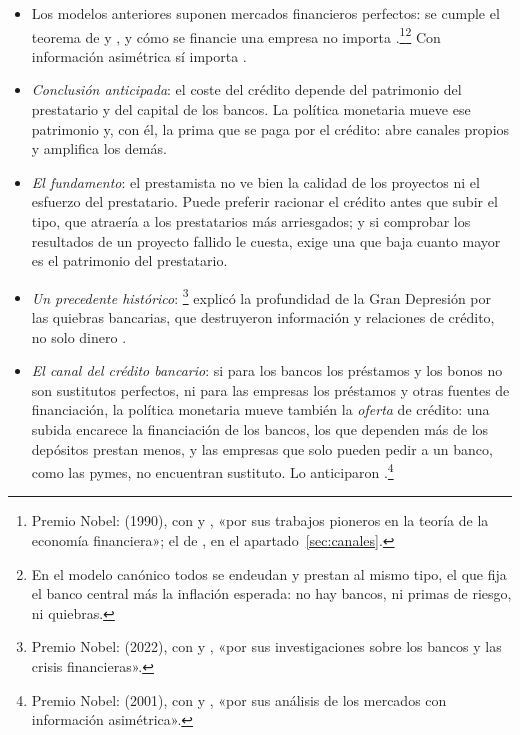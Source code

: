 \documentclass[11pt]{article}
\begin{document}
\begin{itemize}
\item Los modelos anteriores suponen mercados financieros perfectos: se cumple el teorema de  y , y cómo se financie una empresa no importa .\footnote{Premio Nobel:  (1990), con  y , «por sus trabajos pioneros en la teoría de la economía financiera»\nocite{Nobel1990Markowitz}; el de , en el apartado~\ref{sec:canales}.}\footnote{En el modelo canónico todos se endeudan y prestan al mismo tipo, el que fija el banco central más la inflación esperada: no hay bancos, ni primas de riesgo, ni quiebras.} Con información asimétrica sí importa .
\item \emph{Conclusión anticipada}: el coste del crédito depende del patrimonio del prestatario y del capital de los bancos. La política monetaria mueve ese patrimonio y, con él, la prima que se paga por el crédito: abre canales propios y amplifica los demás.
\item \emph{El fundamento}: el prestamista no ve bien la calidad de los proyectos ni el esfuerzo del prestatario. Puede preferir racionar el crédito antes que subir el tipo, que atraería a los prestatarios más arriesgados\nocite{StiglitzWeiss1981Credit}; y si comprobar los resultados de un proyecto fallido le cuesta\nocite{Townsend1979Optimal}, exige una  que baja cuanto mayor es el patrimonio del prestatario\nocite{BernankeGertler1989Agency}.
\item \emph{Un precedente histórico}: \textcite{Bernanke1983Nonmonetary}\footnote{Premio Nobel:  (2022), con  y , «por sus investigaciones sobre los bancos y las crisis financieras»\nocite{Nobel2022Bancos}.} explicó la profundidad de la Gran Depresión por las quiebras bancarias, que destruyeron información y relaciones de crédito, no solo dinero .
\item \emph{El canal del crédito bancario}: si para los bancos los préstamos y los bonos no son sustitutos perfectos, ni para las empresas los préstamos y otras fuentes de financiación, la política monetaria mueve también la \emph{oferta} de crédito: una subida encarece la financiación de los bancos, los que dependen más de los depósitos prestan menos, y las empresas que solo pueden pedir a un banco, como las pymes, no encuentran sustituto\nocite{BernankeBlinder1988,BernankeBlinder1990}. Lo anticiparon \textcite{BlinderStiglitz1983}.\footnote{Premio Nobel:  (2001), con  y , «por sus análisis de los mercados con información asimétrica»\nocite{Nobel2001AkerlofSpenceStiglitz}.}

\end{itemize}
\end{document}
